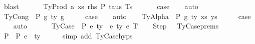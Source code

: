 \begin{isabellebody}
\ blast\isanewline
\ \ \isamarkupfalse%
\isanewline
{}\isamarkupfalse%
\isanewline
\ \ \isamarkupfalse%
\ {\isacharparenleft}{\kern0pt}TyProd\ a\ xs\ rhs\ P\ taus\ Ts\ {\isasymGamma}{\isacharparenright}{\kern0pt}\isanewline
\ \ \isamarkupfalse%
\ \isamarkupfalse%
\ {\isacharquery}{\kern0pt}case\isanewline
\ \ \isamarkupfalse%
\ auto\isanewline
\ \ \isamarkupfalse%
\isanewline
{}\isamarkupfalse%
\isanewline
\ \ \isamarkupfalse%
\ {\isacharparenleft}{\kern0pt}TyCong\ {\isasymGamma}\ P\ g{}\ ty\ g{}{\isacharparenright}{\kern0pt}\isanewline
\ \ \isamarkupfalse%
\ \isamarkupfalse%
\ {\isacharquery}{\kern0pt}case\isanewline
\ \ \isamarkupfalse%
\ auto\isanewline
{}\isamarkupfalse%
\isanewline
\ \ \isamarkupfalse%
\ {\isacharparenleft}{\kern0pt}TyAlpha\ {\isasymGamma}{}\ P\ g\ ty\ xs\ ys{\isacharparenright}{\kern0pt}\isanewline
\ \ \isamarkupfalse%
\ \isamarkupfalse%
\ {\isacharquery}{\kern0pt}case\isanewline
\ \ \isamarkupfalse%
\ auto\isanewline
\ \ \isamarkupfalse%
\isanewline
{}\isamarkupfalse%
\isanewline
\ \ \isamarkupfalse%
\ {\isacharparenleft}{\kern0pt}TyCase\ {\isasymGamma}\ P\ e{}{\isacharprime}{\kern0pt}\ ty{}{\isacharprime}{\kern0pt}\ {\isasymGamma}{}{\isacharprime}{\kern0pt}\ e{}{\isacharprime}{\kern0pt}\ ty{}{\isacharprime}{\kern0pt}\ e{}{\isacharprime}{\kern0pt}\ T{\isacharparenright}{\kern0pt}\isanewline
\isanewline
\ \ \isamarkupfalse%
\ Step\ \ {\isacharequal}{\kern0pt}\ TyCase{\isachardot}{\kern0pt}prems\ \ \ \ \ \isanewline
\isanewline
\ \ \isamarkupfalse%
\ P{}{\isacharcolon}{\kern0pt}\ {\isachardoublequoteopen}{\isasymGamma}\ {\isasymturnstile}{\isacharbraceleft}{\kern0pt}P{\isacharbraceright}{\kern0pt}\ e{}{\isacharprime}{\kern0pt}\ {\isacharcolon}{\kern0pt}\ ty{}{\isacharprime}{\kern0pt}{\isachardoublequoteclose}\isanewline
\ \ \ \ \isamarkupfalse%
\ {\isacharparenleft}{\kern0pt}simp\ add{\isacharcolon}{\kern0pt}\ TyCase{\isachardot}{\kern0pt}hyps{\isacharparenleft}{\kern0pt}{}{\isacharparenright}{\kern0pt}{\isacharparenright}{\kern0pt}\isanewline

\end{isabellebody}
